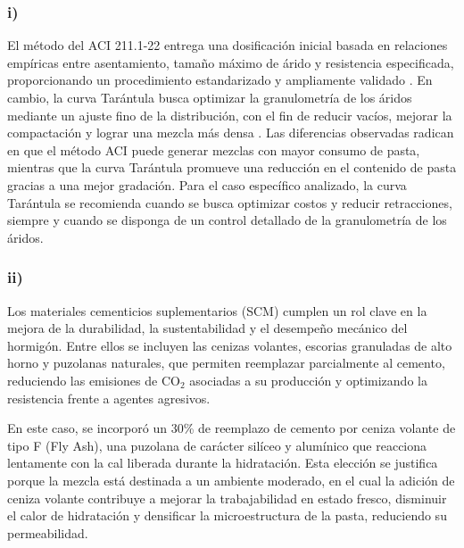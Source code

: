\subsubsection*{i)}

El método del ACI 211.1-22 entrega una dosificación inicial basada en relaciones empíricas entre asentamiento, tamaño máximo de árido y resistencia especificada, proporcionando un procedimiento estandarizado y ampliamente validado \cite{ACI211.1-22}. En cambio, la curva Tarántula busca optimizar la granulometría de los áridos mediante un ajuste fino de la distribución, con el fin de reducir vacíos, mejorar la compactación y lograr una mezcla más densa \cite{Beltran2024TarantulaCurve}. Las diferencias observadas radican en que el método ACI puede generar mezclas con mayor consumo de pasta, mientras que la curva Tarántula promueve una reducción en el contenido de pasta gracias a una mejor gradación. Para el caso específico analizado, la curva Tarántula se recomienda cuando se busca optimizar costos y reducir retracciones, siempre y cuando se disponga de un control detallado de la granulometría de los áridos.

\subsubsection*{ii)}

Los materiales cementicios suplementarios (SCM) cumplen un rol clave en la mejora de la durabilidad, la sustentabilidad y el desempeño mecánico del hormigón. Entre ellos se incluyen las cenizas volantes, escorias granuladas de alto horno y puzolanas naturales, que permiten reemplazar parcialmente al cemento, reduciendo las emisiones de CO$_2$ asociadas a su producción y optimizando la resistencia frente a agentes agresivos. \cite{ScienceDirect_SCMs}

En este caso, se incorporó un 30\% de reemplazo de cemento por ceniza volante de tipo F (Fly Ash), una puzolana de carácter silíceo y alumínico que reacciona lentamente con la cal liberada durante la hidratación. Esta elección se justifica porque la mezcla está destinada a un ambiente moderado, en el cual la adición de ceniza volante contribuye a mejorar la trabajabilidad en estado fresco, disminuir el calor de hidratación y densificar la microestructura de la pasta, reduciendo su permeabilidad. 

